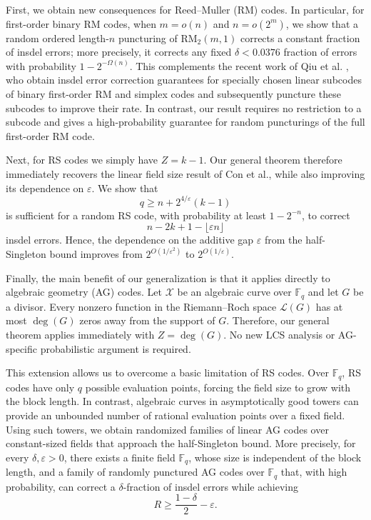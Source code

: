 \documentclass[draft, onecolumn, 11pt]{IEEEtran}
\newcommand{\F}{\mathbb{F}}
\begin{document}
First, we obtain new consequences for Reed--Muller (RM) codes. In particular, for first-order binary RM codes, when $m=o(n)$ and $n=o(2^m)$, we show that a random ordered length-$n$ puncturing of $\mathrm{RM}_2(m,1)$ corrects a constant fraction of insdel errors; more precisely, it corrects any fixed $\delta<0.0376$ fraction of errors with probability $1-2^{-\Omega(n)}$. This complements the recent work of Qiu et al. \cite{qiu2026binary}, who obtain insdel error correction guarantees for specially chosen linear subcodes of binary first-order RM and simplex codes and subsequently puncture these subcodes to improve their rate. In contrast, our result requires no restriction to a subcode and gives a high-probability guarantee for random puncturings of the full first-order RM code.

Next, for RS codes we simply have $Z=k-1$. Our general theorem therefore immediately recovers the linear field size result of Con et al., while also improving its dependence on $\varepsilon$. We show that
$$q\geq n+2^{4/\varepsilon}(k-1)$$
is sufficient for a random RS code, with probability at least $1-2^{-n}$, to correct
$$
n-2k+1-\lfloor\varepsilon n\rfloor
$$
insdel errors. Hence, the dependence on the additive gap $\varepsilon$ from the half-Singleton bound improves from $2^{O(1/\varepsilon^2)}$ to $2^{O(1/\varepsilon)}$.

Finally, the main benefit of our generalization is that it applies directly to algebraic geometry (AG) codes. Let $\mathcal X$ be an algebraic curve over $\mathbb F_q$ and let $G$ be a divisor. Every nonzero function in the Riemann--Roch space $\mathcal L(G)$ has at most $\deg(G)$ zeros away from the support of $G$. Therefore, our general theorem applies immediately with $Z =\deg(G)$. No new LCS analysis or AG-specific probabilistic argument is required. 

This extension allows us to overcome a basic limitation of RS codes. Over $\F_q$, RS codes have only $q$ possible evaluation points, forcing the field size to grow with the block length. In contrast, algebraic curves in asymptotically good towers can provide an unbounded number of rational evaluation points over a fixed field. Using such towers, we obtain randomized families of linear AG codes over constant-sized fields that approach the half-Singleton bound. More precisely, for every $\delta,\varepsilon>0$, there exists a finite field $\F_q$, whose size is independent of the block length, and a family of randomly punctured AG codes over $\F_q$ that, with high probability, can correct a $\delta$-fraction of insdel errors while achieving
$$R\geq \frac{1-\delta}{2}-\varepsilon.$$
\end{document}
